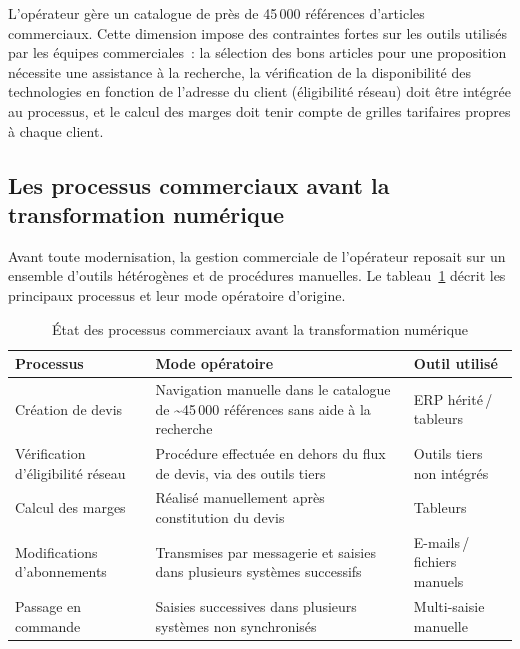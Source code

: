 L'op\'erateur g\`ere un catalogue de pr\`es de 45\,000 r\'ef\'erences d'articles commerciaux. Cette dimension impose des contraintes fortes sur les outils utilis\'es par les \'equipes commerciales~: la s\'election des bons articles pour une proposition n\'ecessite une assistance \`a la recherche, la v\'erification de la disponibilit\'e des technologies en fonction de l'adresse du client (\'eligibilit\'e r\'eseau) doit \^etre int\'egr\'ee au processus, et le calcul des marges doit tenir compte de grilles tarifaires propres \`a chaque client.

\subsection{Les processus commerciaux avant la transformation num\'erique}

Avant toute modernisation, la gestion commerciale de l'op\'erateur reposait sur un ensemble d'outils h\'et\'erog\`enes et de proc\'edures manuelles. Le tableau~\ref{tab:etat_existant} d\'ecrit les principaux processus et leur mode op\'eratoire d'origine.

\begin{table}[H]
\caption{\'Etat des processus commerciaux avant la transformation num\'erique}
\label{tab:etat_existant}
\centering
\renewcommand{\arraystretch}{1.55}
\begin{tabular}{|>{\raggedright\arraybackslash}p{3.4cm}|>{\raggedright\arraybackslash}p{5.6cm}|>{\raggedright\arraybackslash}p{4.0cm}|}
\hline
\rowcolor{gray!15}
\textbf{Processus} & \textbf{Mode op\'eratoire} & \textbf{Outil utilis\'e} \\
\hline
Cr\'eation de devis & Navigation manuelle dans le catalogue de \textasciitilde{}45\,000 r\'ef\'erences sans aide \`a la recherche & ERP h\'erit\'e\,/\,tableurs \\
\hline
V\'erification d'\'eligibilit\'e r\'eseau & Proc\'edure effectu\'ee en dehors du flux de devis, via des outils tiers & Outils tiers non int\'egr\'es \\
\hline
Calcul des marges & R\'ealis\'e manuellement apr\`es constitution du devis & Tableurs \\
\hline
Modifications d'abonnements & Transmises par messagerie et saisies dans plusieurs syst\`emes successifs & E-mails\,/\,fichiers manuels \\
\hline
Passage en commande & Saisies successives dans plusieurs syst\`emes non synchronis\'es & Multi-saisie manuelle \\
\hline
\end{tabular}
\end{table}

